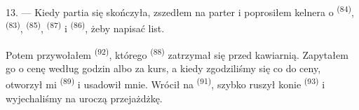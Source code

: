 13. --- Kiedy partia się skończyła, zszedłem na parter i poprosiłem kelnera o
 \textsuperscript{(84)},  \textsuperscript{(83)},
 \textsuperscript{(85)},  \textsuperscript{(87)} i
 \textsuperscript{(86)}, żeby napisać list.

Potem przywołałem  \textsuperscript{(92)}, którego 
\textsuperscript{(88)} zatrzymał się przed kawiarnią. Zapytałem go o cenę według godzin
albo za kurs, a kiedy zgodziliśmy się co do ceny, otworzył mi 
\textsuperscript{(89)} i usadowił mnie. Wrócił na  \textsuperscript{(91)},
szybko ruszył konie  \textsuperscript{(93)} i wyjechaliśmy na uroczą
przejażdżkę.
\VUsaut{6.0mm}
\VUfilet{22mm}
